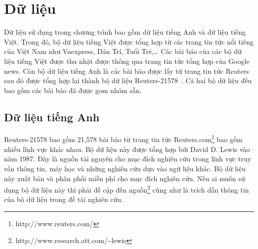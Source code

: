 

\section{Dữ liệu}
Dữ liệu sử dụng trong chương trình bao gồm dữ liệu tiếng Anh và dữ liệu tiếng Việt.
Trong đó, bộ dữ liệu tiếng Việt được tổng hợp từ các trang tin tức nổi tiếng của Việt Nam như Vnexpress, Dân Trí, Tuổi Trẻ,\ldots 
Các bài báo của các bộ dữ liệu tiếng Việt được thu nhặt được thông qua trang tin tức tổng hợp của Google news.
Còn bộ dữ liệu tiếng Anh là các bài báo được lấy từ trang tin tức Reuters sau đó được tổng hợp lại thành bộ dữ liệu Reuters-21578~\cite{Reuters-21578}.
Cả hai bộ dữ liệu đều bao gồm các bài báo đã được gom nhóm sẵn.

\subsection{Dữ liệu tiếng Anh}
Reuters-21578 bao gồm 21,578 bài báo từ trang tin tức Reuters.com\footnote{http://www.reuters.com/} bao gồm nhiều lĩnh vực khác nhau.
Bộ dữ liệu này được tổng hợp bởi David D. Lewis vào năm 1987.
Đây là nguồn tài nguyên cho mục đích nghiên cứu trong lĩnh vực truy vấn thông tin, máy học và những nghiên cứu dựa vào ngữ liệu khác.
Bộ dữ liệu này xuất bản và phân phối miễn phí cho mục đích nghiên cứu.
Nếu ai muốn sử dụng bộ dữ liệu này thì phải đề cập đến nguồn\footnote{http://www.research.att.com/\textasciitilde{}lewis} cũng như là trích dẫn thông tin của bộ dữ liệu trong đề tài nghiên cứu.

